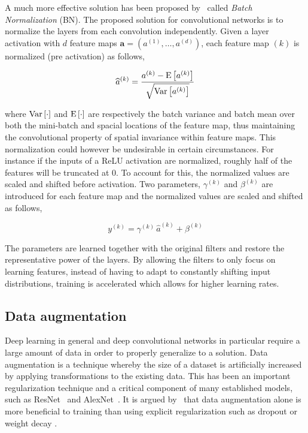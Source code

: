 A much more effective solution has been proposed by\ \textcite{ioffe2015batch} called \textit{Batch Normalization} (BN).
The proposed solution for convolutional networks is to normalize the layers from each convolution independently. Given a layer activation with \(d\) feature maps \(\mathbf{a}=\left(a^{(1)},\dots,a^{(d)}\right)\), each feature map \((k)\) is normalized (pre activation) as follows,

\begin{equation*}
  \widehat{a}^{(k)}=\frac{a^{(k)}-\text{E}\left[a^{(k)}\right]}{\sqrt{\text{Var}\left[a^{(k)}\right]}}
\end{equation*}

where \(\text{Var}\left[\cdot\right]\) and \(\text{E}\left[\cdot\right]\) are respectively the batch variance and batch mean over both the mini-batch and spacial locations of the feature map, thus maintaining the convolutional property of spatial invariance within feature maps.
This normalization could however be undesirable in certain circumstances.
For instance if the inputs of a ReLU activation are normalized, roughly half of the features will be truncated at 0.
To account for this, the normalized values are scaled and shifted before activation.
Two parameters, \(\gamma^{(k)}\) and \(\beta^{(k)}\) are introduced for each feature map and the normalized values are scaled and shifted as follows,

\begin{equation*}
  y^{(k)}=\gamma^{(k)}\,\widehat{a}^{(k)}+\beta^{(k)}
\end{equation*}

The parameters are learned together with the original filters and restore the representative power of the layers.
By allowing the filters to only focus on learning features, instead of having to adapt to constantly shifting input distributions, training is accelerated which allows for higher learning rates.

\subsection{Data augmentation}
Deep learning in general and deep convolutional networks in particular require a large amount of data in order to properly generalize to a solution.
Data augmentation is a technique whereby the size of a dataset is artificially increased by applying transformations to the existing data.
This has been an important regularization technique and a critical component of many established models, such as ResNet\ \parencite{he2015deep} and AlexNet\ \parencite{alexnet}.
It is argued by\ \citeauthor{Hern_ndez_Garc_a_2018} that data augmentation alone is more beneficial to training than using explicit regularization such as dropout or weight decay \parencite{Hern_ndez_Garc_a_2018}.

